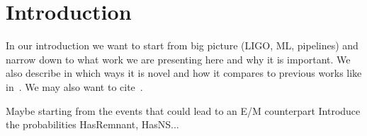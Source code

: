 \section{Introduction}
In our introduction we want to start from big picture (LIGO, ML, pipelines)
and narrow down to what work we are presenting here and why it is important. We
also describe in which ways it is novel and how it compares to previous works
like in~\cite{Chatterjee:2019avs}. We may also want to cite~\cite{Sachdev:2020lfd}. 

Maybe starting from the events that could lead to an E/M counterpart 
Introduce the probabilities HasRemnant, HasNS...
